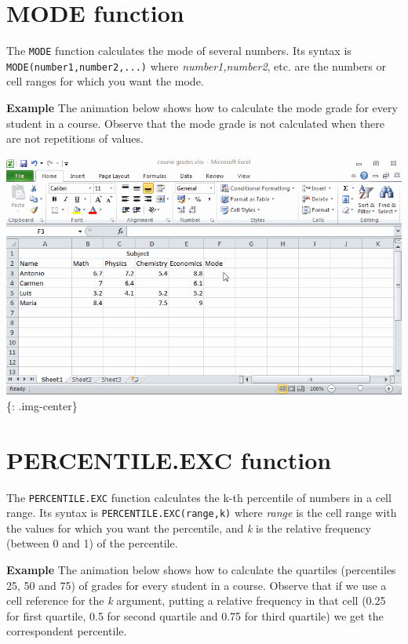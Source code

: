 \section{MODE function}
\label{modefunction}

The \texttt{MODE} function calculates the mode of several numbers. Its syntax is \texttt{MODE(number1,number2,...)} where \emph{number1,number2}, etc. are the numbers or cell ranges for which you want the mode. 

\textbf{Example} The animation below shows how to calculate the mode grade for every student in a course. Observe that the mode grade is not calculated when there are not repetitions of values. 

\includegraphics[keepaspectratio,width=\textwidth,height=0.75\textheight]{img/example_function_mode.gif}
\{: .img-center\}

\section{PERCENTILE.EXC function}
\label{percentile.excfunction}

The \texttt{PERCENTILE.EXC} function calculates the k-th percentile of numbers in a cell range. Its syntax is \texttt{PERCENTILE.EXC(range,k)} where \emph{range} is the cell range with the values for which you want the percentile, and \emph{k} is the relative frequency (between 0 and 1) of the percentile. 

\textbf{Example} The animation below shows how to calculate the quartiles (percentiles 25, 50 and 75) of grades for every student in a course. Observe that if we use a cell reference for the \emph{k} argument, putting a relative frequency in that cell (0.25 for first quartile, 0.5 for second quartile and 0.75 for third quartile) we get the correspondent percentile. 

